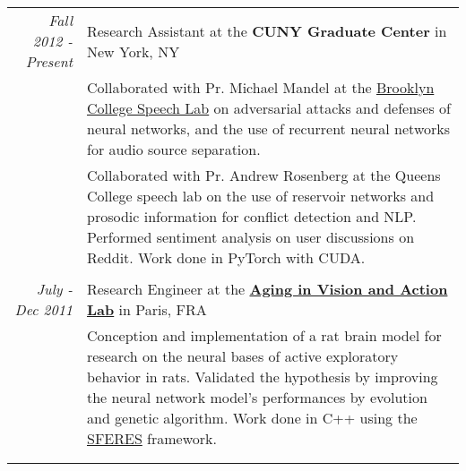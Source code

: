 \documentclass[a4paper,10pt]{article}
\begin{document}
\begin{tabular}{r|p{14cm}}
        \emph{Fall 2012 - Present} & Research Assistant at the {\bfseries CUNY Graduate Center} in New York, NY \\
        & \small{Collaborated with Pr. Michael Mandel at the \href{https://www.gc.cuny.edu/CUNY_GC/media/Computer-Science/SpeechLab.pdf}{Brooklyn College Speech Lab} on adversarial attacks and defenses of neural networks, and the use of recurrent neural networks for audio source separation.}\\
        & \small{Collaborated with Pr. Andrew Rosenberg at the Queens College speech lab on the use of reservoir networks and prosodic information for conflict detection and NLP. Performed sentiment analysis on user discussions on Reddit. Work done in PyTorch with CUDA.}\\
        \multicolumn{2}{c}{} \vspace{-1.5mm} \\

        \emph{July - Dec 2011} & Research Engineer at the {\bfseries \href{http://www.aging-vision-action.fr/}{Aging in Vision and Action Lab} }in Paris, FRA\\
        & \small{Conception and implementation of a rat brain model for research on the neural bases of active exploratory behavior in rats. Validated the hypothesis by improving the neural network model's performances by evolution and genetic algorithm. Work done in C++ using the \href{https://github.com/sferes2/sferes2}{SFERES} framework.}\\
        \multicolumn{2}{c}{} \vspace{-1.5mm} \\
        
        \multicolumn{2}{c}{} \vspace{-1.5mm} \\


\end{tabular}
\end{document}
